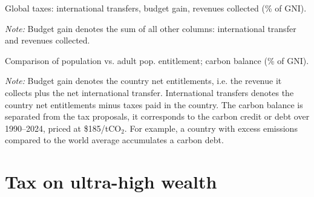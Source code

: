 \documentclass[12pt,english]{article}
\begin{document}
\clearpage
\begin{table}[!h]
  \caption{\label{tab:transfers_gain}Global taxes: international transfers, budget gain, revenues collected (\% of GNI). }
  \makebox[\textwidth][c]{
} 
{\footnotesize \textit{Note:}  Budget gain denotes the sum of all other columns: international transfer and revenues collected. %
}
\end{table}
\clearpage

\begin{table}[!h]
  \vspace{-1cm}
  \caption{\label{tab:transfers_balance}Comparison of population vs. adult pop. entitlement; carbon balance (\% of GNI). }
  \makebox[\textwidth][c]{
} 
{\footnotesize \textit{Note:} Budget gain denotes the country net entitlements, i.e. the revenue it collects plus the net international transfer. International transfers denotes the country net entitlements minus taxes paid in the country. The carbon balance is separated from the tax proposals, it corresponds to the carbon credit or debt over 1990--2024, priced at \$185/tCO$_\text{2}$. For example, a country with excess emissions compared to the world average accumulates a carbon debt. %
}
\end{table}
\clearpage


\section{Tax on ultra-high wealth}\label{sec:wealth}

\end{document}

